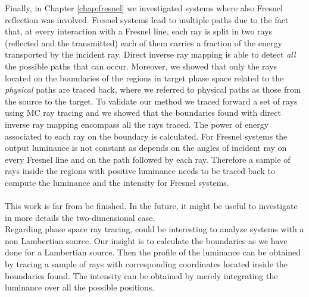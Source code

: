 Finally, in Chapter \ref{chap:fresnel} we investigated systems where also Fresnel reflection was involved. Fresnel systems lead to multiple paths due to the fact that, at every interaction with a Fresnel line, each ray is split in two rays (reflected and the transmitted) each of them carries a fraction of the energy transported by the incident ray. Direct inverse ray mapping is able to detect \textit{all} the possible paths that can occur. Moreover, we showed that only the rays located on the boundaries of the regions in target phase space related to the \textit{physical} paths are traced back, where we referred to physical paths as those from the source to the target. To validate our method we traced forward a set of rays using MC ray tracing and we showed that the boundaries found with direct inverse ray mapping encompass all the rays traced. The power of energy associated to each ray on the boundary is calculated. For Fresnel systems the output luminance is not constant as depends on the angles of incident ray on every Fresnel line and on the path followed by each ray. Therefore a sample of rays inside the regions with positive luminance needs to be traced back to compute the luminance and the intensity for Fresnel systems. \\
\\\indent This work is far from be finished. In the future, it might be useful to investigate in more details the two-dimensional case. \\ \indent 
Regarding phase space ray tracing, could be interesting to analyze systems with a non Lambertian source. Our insight is to calculate the boundaries as we have done for a Lambertian source. Then the profile of the luminance can be obtained by tracing a sample of rays with corresponding coordinates located inside the boundaries found. The intensity can be obtained by merely integrating the luminance over all the possible positions. \\ \indent 
